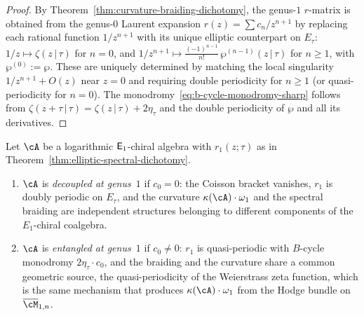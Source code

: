 \begin{proof}
By Theorem~\ref{thm:curvature-braiding-dichotomy}, the
genus-$1$ $r$-matrix is obtained from the genus-$0$ Laurent
expansion $r(z)=\sum c_n/z^{n+1}$ by replacing each rational
function $1/z^{n+1}$ with its unique elliptic counterpart on
$E_\tau$: $1/z\mapsto\zeta(z\,|\,\tau)$ for $n=0$, and
$1/z^{n+1}\mapsto\frac{(-1)^{n-1}}{n!}\,\wp^{(n-1)}(z\,|\,\tau)$
for $n\ge 1$, with $\wp^{(0)}:=\wp$. These are uniquely
determined by matching the local singularity $1/z^{n+1}+O(z)$
near $z=0$ and requiring double periodicity for $n\ge 1$
(or quasi-periodicity for $n=0$).
The monodromy~\eqref{eq:b-cycle-monodromy-sharp} follows from
$\zeta(z+\tau\,|\,\tau)=\zeta(z\,|\,\tau)+2\eta_\tau$ and the
double periodicity of $\wp$ and all its derivatives.
\end{proof}

\begin{definition}
\label{def:decoupled-entangled}
Let $\cA$ be a logarithmic $\mathsf{E}_1$-chiral algebra with
$r_1(z;\tau)$ as in
Theorem~\ref{thm:elliptic-spectral-dichotomy}.
\begin{enumerate}[label=\textup{(\roman*)}]
\item $\cA$ is \emph{decoupled at genus~$1$} if $c_0=0$:
 the Coisson bracket vanishes, $r_1$ is doubly periodic on
 $E_\tau$, and the curvature $\kappa(\cA)\cdot\omega_1$
 and the spectral braiding are independent structures
 belonging to different components of the $E_1$-chiral coalgebra.

\item $\cA$ is \emph{entangled at genus~$1$} if $c_0\ne 0$:
 $r_1$ is quasi-periodic with $B$-cycle monodromy
 $2\eta_\tau\cdot c_0$, and the braiding and the curvature
 share a common geometric source, the quasi-periodicity
 of the Weierstrass zeta function, which is the same
 mechanism that produces $\kappa(\cA)\cdot\omega_1$ from the
 Hodge bundle on $\overline{\cM}_{1,n}$.
\end{enumerate}
\end{definition}

